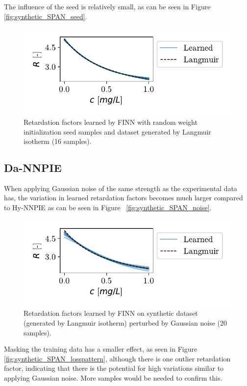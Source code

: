 The influence of the seed is relatively small, as can be seen in Figure \vref{fig:synthetic_SPAN_seed}.


\begin{figure}[h]
    \centering
    \includegraphics{figs/finn_synthetic_SPAN_seed.pdf}
    \caption{Retardation factors learned by FINN with random weight initialization seed samples and dataset generated by Langmuir isotherm (16 samples).}
    \label{fig:synthetic_SPAN_seed}
\end{figure}



\subsection{Da-NNPIE}
When applying Gaussian noise of the same strength as the experimental data has, the variation in learned retardation factors becomes much larger compared to Hy-NNPIE as can be seen in Figure ~\vref{fig:synthetic_SPAN_noise}.

\begin{figure}[h]
    \centering
    \includegraphics{figs/finn_synthetic_SPAN_noise.pdf}
    \caption{Retardation factors learned by FINN on synthetic dataset (generated by Langmuir isotherm) perturbed by Gaussian noise (20 samples).}
    \label{fig:synthetic_SPAN_noise}
\end{figure}


Masking the training data has a smaller effect, as seen in Figure \vref{fig:synthetic_SPAN_losspattern}, although there is one outlier retardation factor, indicating that there is the potential for high variations similar to applying Gaussian noise. More samples would be needed to confirm this.

